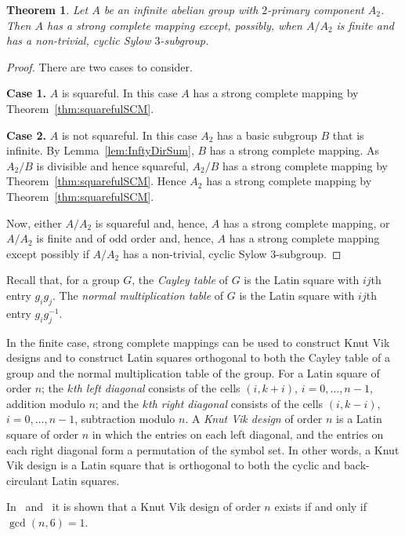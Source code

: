 \documentclass[12pt,a4paper]{article}
\newtheorem{thm}{Theorem}[section]
\begin{document}
\begin{thm}\label{thm:InftyAbSCM}
Let $A$ be an infinite abelian group with $2$-primary component $A_2$. Then $A$ has a strong complete mapping except, possibly, when $A/A_2$ is finite and has a non-trivial, cyclic Sylow $3$-subgroup.
\end{thm}
\begin{proof} There are two cases to consider.
\vspace{12 pt}

\noindent\textbf{Case 1.} $A$ is squareful. In this case $A$ has a strong complete mapping by Theorem~\ref{thm:squarefulSCM}.
\vspace{12 pt}

\noindent\textbf{Case 2.} $A$ is not squareful. In this case $A_2$ has a basic subgroup $B$ that is infinite. By Lemma~\ref{lem:InftyDirSum}, $B$ has a strong complete mapping. As $A_2/B$ is divisible and hence squareful, $A_2/B$ has a strong complete mapping by Theorem~\ref{thm:squarefulSCM}. Hence $A_2$ has a strong complete mapping by Theorem~\ref{thm:squarefulSCM}.

Now, either $A/A_2$ is squareful and, hence, $A$ has a strong complete mapping, or $A/A_2$ is finite and of odd order and, hence, $A$ has a strong complete mapping except possibly if $A/A_2$ has a non-trivial, cyclic Sylow $3$-subgroup.
\end{proof}

Recall that, for a group $G$, the {\em Cayley table} of $G$ is the Latin square with $ij$th entry $g_ig_j$. The {\em normal multiplication table} of $G$ is the Latin square with $ij$th entry $g_ig_j^{-1}$.


In the finite case, strong complete mappings can be used to construct Knut Vik designs and to construct Latin squares orthogonal to both the Cayley table of a group and the normal multiplication table of the group. For a Latin square of order $n$; the {\em $k$th left diagonal} consists of the cells $(i,k+i)$, $i=0,\dots,n-1$, addition modulo $n$; and the {\em $k$th right diagonal} consists of the cells $(i,k-i)$, $i=0,\dots,n-1$, subtraction modulo $n$. A {\em Knut Vik design} of order $n$ is a Latin square of order $n$ in which the entries on each left diagonal, and the entries on each right diagonal form a permutation of the symbol set.  In other words, a Knut Vik design is a Latin square that is orthogonal to both the cyclic and back-circulant Latin squares.

In~\cite{Hedayat:1977} and~\cite{Hedayat/Federer:1975} it is shown that a Knut Vik design of order $n$ exists if and only if $\gcd(n,6)=1$. 
\end{document}
